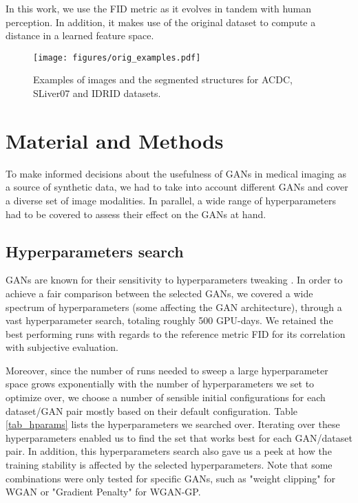 \documentclass[preprint,12pt, authoryear]{elsarticle}
\begin{document}
In this work, we use the FID metric as it evolves in tandem with human perception. In addition, it makes use of the original dataset to compute a distance in a learned feature space.

\begin{figure}[tp]
\centering
\texttt{[image: figures/orig\_examples.pdf]}
\caption{\small Examples of images and the segmented structures for ACDC, SLiver07 and IDRID datasets.}
\label{fig_orig_images_ex}
\end{figure}



\section{Material and Methods}
\label{sec:protocol}
To make informed decisions about the usefulness of GANs in medical imaging as a source of synthetic data, we had to take into account different GANs and cover a diverse set of image modalities. In parallel, a wide range of hyperparameters had to be covered to assess their effect on the GANs at hand.


\subsection{Hyperparameters search}


GANs are known for their sensitivity to hyperparameters tweaking \citep{Lucic2018AreGC}. In order to achieve a fair comparison between the selected GANs, we covered a wide spectrum of hyperparameters (some affecting the GAN architecture), through a vast hyperparameter search, totaling roughly 500 GPU-days. We retained the best performing runs with regards to the reference metric FID for its correlation with subjective evaluation.

Moreover, since the number of runs needed to sweep a large hyperparameter space grows exponentially with the number of hyperparameters we set to optimize over, we choose a number of sensible initial configurations for each dataset/GAN pair mostly based on their default configuration. 
Table \ref{tab_hparams} lists the hyperparameters we searched over. Iterating over these hyperparameters enabled us to find the set that works best for each GAN/dataset pair. In addition, this hyperparameters search also gave us a peek at how the training stability is affected by the selected hyperparameters. Note that some combinations were only tested for specific GANs, such as "weight clipping" for WGAN or "Gradient Penalty" for WGAN-GP.
\end{document}
